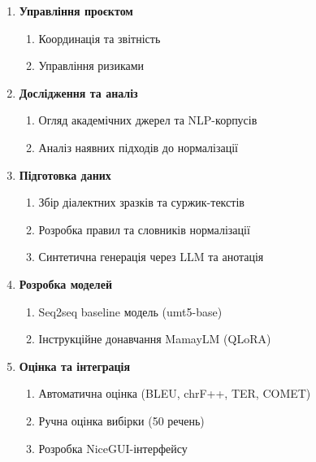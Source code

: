 \documentclass[14pt]{extarticle}
\begin{document}
\vspace{4pt}
\begin{enumerate}[label=\textbf{\arabic*.}, leftmargin=1.5cm, itemsep=3pt, topsep=4pt, parsep=0pt]
  \item \textbf{Управління проєктом}
  \begin{enumerate}[label=1.\arabic*., leftmargin=1.2cm, itemsep=1pt, topsep=2pt, parsep=0pt, partopsep=0pt]
    \item Координація та звітність
    \item Управління ризиками
  \end{enumerate}

  \item \textbf{Дослідження та аналіз}
  \begin{enumerate}[label=2.\arabic*., leftmargin=1.2cm, itemsep=1pt, topsep=2pt, parsep=0pt, partopsep=0pt]
    \item Огляд академічних джерел та NLP-корпусів
    \item Аналіз наявних підходів до нормалізації
  \end{enumerate}

  \item \textbf{Підготовка даних}
  \begin{enumerate}[label=3.\arabic*., leftmargin=1.2cm, itemsep=1pt, topsep=2pt, parsep=0pt, partopsep=0pt]
    \item Збір діалектних зразків та суржик-текстів
    \item Розробка правил та словників нормалізації
    \item Синтетична генерація через LLM та анотація
  \end{enumerate}

  \item \textbf{Розробка моделей}
  \begin{enumerate}[label=4.\arabic*., leftmargin=1.2cm, itemsep=1pt, topsep=2pt, parsep=0pt, partopsep=0pt]
    \item Seq2seq baseline модель (umt5-base)
    \item Інструкційне донавчання MamayLM (QLoRA)
  \end{enumerate}

  \item \textbf{Оцінка та інтеграція}
  \begin{enumerate}[label=5.\arabic*., leftmargin=1.2cm, itemsep=1pt, topsep=2pt, parsep=0pt, partopsep=0pt]
    \item Автоматична оцінка (BLEU, chrF++, TER, COMET)
    \item Ручна оцінка вибірки (50 речень)
    \item Розробка NiceGUI-інтерфейсу
  \end{enumerate}


\end{enumerate}
\end{document}
